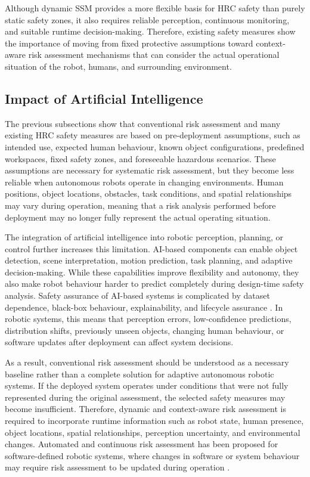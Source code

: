 {Although dynamic SSM provides a more flexible basis for HRC safety than purely static safety zones, it also requires reliable perception, continuous monitoring, and suitable runtime decision-making. Therefore, existing safety measures show the importance of moving from fixed protective assumptions toward context-aware risk assessment mechanisms that can consider the actual operational situation of the robot, humans, and surrounding environment.

}

\subsection{Impact of Artificial Intelligence}

{\small

The previous subsections show that conventional risk assessment and many existing HRC safety measures are based on pre-deployment assumptions, such as intended use, expected human behaviour, known object configurations, predefined workspaces, fixed safety zones, and foreseeable hazardous scenarios. These assumptions are necessary for systematic risk assessment, but they become less reliable when autonomous robots operate in changing environments. Human positions, object locations, obstacles, task conditions, and spatial relationships may vary during operation, meaning that a risk analysis performed before deployment may no longer fully represent the actual operating situation.

The integration of artificial intelligence into robotic perception, planning, or control further increases this limitation. AI-based components can enable object detection, scene interpretation, motion prediction, task planning, and adaptive decision-making. While these capabilities improve flexibility and autonomy, they also make robot behaviour harder to predict completely during design-time safety analysis. Safety assurance of AI-based systems is complicated by dataset dependence, black-box behaviour, explainability, and lifecycle assurance \cite{silvaneto2022aisafetyassurance}. In robotic systems, this means that perception errors, low-confidence predictions, distribution shifts, previously unseen objects, changing human behaviour, or software updates after deployment can affect system decisions.

As a result, conventional risk assessment should be understood as a necessary baseline rather than a complete solution for adaptive autonomous robotic systems. If the deployed system operates under conditions that were not fully represented during the original assessment, the selected safety measures may become insufficient. Therefore, dynamic and context-aware risk assessment is required to incorporate runtime information such as robot state, human presence, object locations, spatial relationships, perception uncertainty, and environmental changes. Automated and continuous risk assessment has been proposed for software-defined robotic systems, where changes in software or system behaviour may require risk assessment to be updated during operation \cite{grimmeisen2023continuousrisk}.

}

